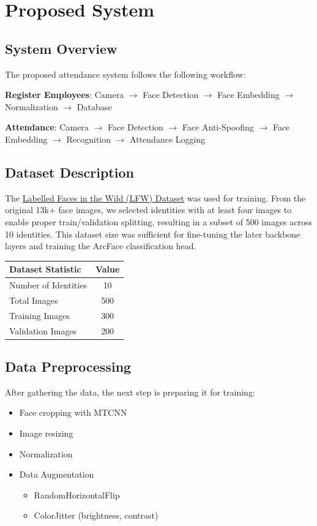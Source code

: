 \documentclass[sommairechap,stylejchiquet]{these_gi}
\begin{document}
\section{Proposed System}

\subsection{System Overview}
The proposed attendance system follows the following workflow:

\textbf{Register Employees}:
Camera $\rightarrow$ Face Detection $\rightarrow$ Face Embedding $\rightarrow$ Normalization $\rightarrow$ Database

\textbf{Attendance}:
Camera $\rightarrow$ Face Detection $\rightarrow$ Face Anti-Spoofing $\rightarrow$ Face Embedding $\rightarrow$ Recognition $\rightarrow$ Attendance Logging

\subsection{Dataset Description}
The \href{https://www.kaggle.com/datasets/jessicali9530/lfw-dataset}{Labelled Faces in the Wild (LFW) Dataset} was used for training. From the original 13k+ face images, we selected identities with at least four images to enable proper train/validation splitting, resulting in a subset of 500 images across 10 identities. This dataset size was sufficient for fine-tuning the later backbone layers and training the ArcFace classification head.

\begin{center}
\begin{tabular}{|l|c|}
\hline
\textbf{Dataset Statistic} & \textbf{Value} \\
\hline
Number of Identities & 10 \\
\hline
Total Images & 500 \\
\hline
Training Images & 300 \\
\hline
Validation Images & 200 \\
\hline
\end{tabular}
\end{center}

\subsection{Data Preprocessing}
After gathering the data, the next step is preparing it for training:
\begin{itemize}
    \item Face cropping with MTCNN
    \item Image resizing
    \item Normalization
    \item Data Augmentation
    \begin{itemize}
        \item RandomHorizontalFlip
        \item ColorJitter (brightness, contrast)
    \end{itemize}
\end{itemize}
\end{document}
